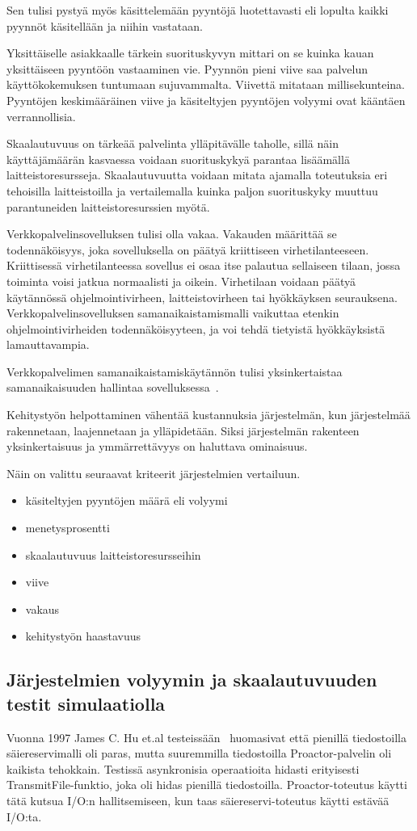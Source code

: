 \documentclass[finnish]{tktltiki2}
\theoremstyle{definition}
\theoremstyle{remark}
\begin{document}
Sen tulisi pystyä myös käsittelemään pyyntöjä
luotettavasti eli lopulta kaikki pyynnöt käsitellään ja niihin vastataan.

Yksittäiselle asiakkaalle tärkein suorituskyvyn mittari on se kuinka kauan
yksittäiseen pyyntöön vastaaminen vie.
Pyynnön pieni viive saa
palvelun käyttökokemuksen tuntumaan sujuvammalta.
Viivettä mitataan millisekunteina.
Pyyntöjen keskimääräinen viive ja käsiteltyjen pyyntöjen
volyymi ovat kääntäen verrannollisia.

Skaalautuvuus on tärkeää palvelinta ylläpitävälle taholle, sillä
näin käyttäjämäärän kasvaessa voidaan suorituskykyä parantaa
lisäämällä laitteistoresursseja. Skaalautuvuutta voidaan
mitata ajamalla toteutuksia eri tehoisilla laitteistoilla
ja vertailemalla kuinka paljon suorituskyky muuttuu 
parantuneiden laitteistoresurssien myötä.

Verkkopalvelinsovelluksen tulisi
olla vakaa. Vakauden määrittää
se todennäköisyys, joka sovelluksella on
päätyä kriittiseen virhetilanteeseen. Kriittisessä
virhetilanteessa sovellus ei osaa
itse palautua sellaiseen tilaan, jossa
toiminta voisi jatkua normaalisti ja oikein.
Virhetilaan voidaan päätyä käytännössä
ohjelmointivirheen, laitteistovirheen tai hyökkäyksen seurauksena.
Verkkopalvelinsovelluksen samanaikaistamismalli
vaikuttaa etenkin ohjelmointivirheiden todennäköisyyteen,
ja voi tehdä tietyistä hyökkäyksistä lamauttavampia.


Verkkopalvelimen samanaikaistamiskäytännön tulisi
yksinkertaistaa samanaikaisuuden hallintaa sovelluksessa~\cite{pyarali_proactor_1997}.

Kehitystyön helpottaminen vähentää kustannuksia
järjestelmän, kun järjestelmää rakennetaan, laajennetaan ja ylläpidetään.
Siksi järjestelmän rakenteen yksinkertaisuus ja
ymmärrettävyys on haluttava ominaisuus.

Näin on valittu seuraavat kriteerit
järjestelmien vertailuun.
\begin{itemize}
  \item käsiteltyjen pyyntöjen määrä eli volyymi
  \item menetysprosentti
  \item skaalautuvuus laitteistoresursseihin
  \item viive
  \item vakaus
  \item kehitystyön haastavuus
\end{itemize}

\subsection{Järjestelmien volyymin ja skaalautuvuuden testit simulaatiolla}
Vuonna 1997 James C. Hu et.al testeissään~\cite{hu_measuring_1997} huomasivat
että pienillä tiedostoilla säiereservimalli oli paras,
mutta suuremmilla tiedostoilla Proactor-palvelin oli kaikista tehokkain.
Testissä asynkronisia operaatioita hidasti
erityisesti TransmitFile-funktio, joka oli
hidas pienillä tiedostoilla.
Proactor-toteutus käytti tätä kutsua I/O:n hallitsemiseen,
kun taas säiereservi-toteutus käytti estävää I/O:ta.
\end{document}
